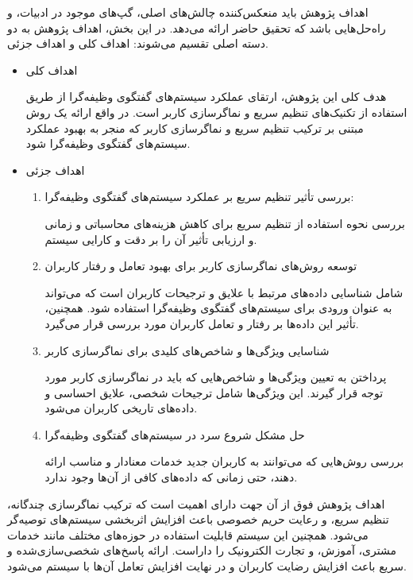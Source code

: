 اهداف پژوهش باید منعکس‌کننده چالش‌های اصلی، گپ‌های موجود در ادبیات، و راه‌حل‌هایی باشد که تحقیق حاضر ارائه می‌دهد. در این بخش، اهداف پژوهش به دو دسته اصلی تقسیم می‌شوند: اهداف کلی و اهداف جزئی.

\begin{itemize}
\item
اهداف کلی

هدف کلی این پژوهش، ارتقای عملکرد سیستم‌های گفتگوی وظیفه‌گرا از طریق استفاده از تکنیک‌های تنظیم سریع و نماگر‌سازی کاربر است. در واقع ارائه یک روش مبتنی بر ترکیب تنظیم سریع و نماگر‌سازی کاربر که منجر به بهبود عملکرد سیستم‌های گفتگوی وظیفه‌گرا شود.

\item
اهداف جزئی
\begin{enumerate}
\item
بررسی تأثیر تنظیم سریع بر عملکرد سیستم‌های گفتگوی وظیفه‌گرا:

بررسی نحوه استفاده از تنظیم سریع برای کاهش هزینه‌های محاسباتی و زمانی و ارزیابی تأثیر آن را بر دقت و کارایی سیستم.

\item
توسعه روش‌های نماگر‌سازی کاربر برای بهبود تعامل و رفتار کاربران

شامل شناسایی داده‌های مرتبط با علایق و ترجیحات کاربران است که می‌تواند به عنوان ورودی برای سیستم‌های گفتگوی وظیفه‌گرا استفاده شود. همچنین، تأثیر این داده‌ها بر رفتار و تعامل کاربران مورد بررسی قرار می‌گیرد.

\item
شناسایی ویژگی‌ها و شاخص‌های کلیدی برای نماگر‌سازی کاربر

پرداختن به تعیین ویژگی‌ها و شاخص‌هایی که باید در نماگر‌سازی کاربر مورد توجه قرار گیرند. این ویژگی‌ها شامل ترجیحات شخصی، علایق احساسی و داده‌های تاریخی کاربران می‌شود.

\item
حل مشکل شروع سرد در سیستم‌های گفتگوی وظیفه‌گرا

بررسی روش‌هایی که می‌توانند به کاربران جدید خدمات معنادار و مناسب ارائه دهند، حتی زمانی که داده‌های کافی از آن‌ها وجود ندارد.
\end{enumerate}
\end{itemize}

اهداف پژوهش فوق از آن جهت دارای اهمیت است که ترکیب نماگر‌سازی چندگانه، تنظیم سریع، و رعایت حریم خصوصی باعث افزایش اثربخشی سیستم‌های توصیه‌گر می‌شود. همچنین این سیستم قابلیت استفاده در حوزه‌های مختلف مانند خدمات مشتری، آموزش، و تجارت الکترونیک را داراست. ارائه پاسخ‌های شخصی‌سازی‌شده و سریع باعث افزایش رضایت کاربران و در نهایت افزایش تعامل آن‌ها با سیستم می‌شود.


